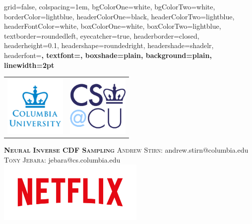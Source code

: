 \documentclass[landscape,paperwidth=40in,paperheight=30in,margin=1in]{baposter}
\begin{document}


\begin{poster}%
  {
  grid=false,
  colspacing=1em,
  bgColorOne=white,
  bgColorTwo=white,
  borderColor=lightblue,
  headerColorOne=black,
  headerColorTwo=lightblue,
  headerFontColor=white,
  boxColorOne=white,
  boxColorTwo=lightblue,
  textborder=roundedleft,
  eyecatcher=true,
  headerborder=closed,
  headerheight=0.1\textheight,
  headershape=roundedright,
  headershade=shadelr,
  headerfont=\large\bf\textsc, %
  textfont={\setlength{\parindent}{1.5em}},
  boxshade=plain,
  background=plain,
  linewidth=2pt
  }
  {
    \begin{tabular}{cc}
         \includegraphics[height=8.0em]{images/columbia_university.png}
         &
         \includegraphics[height=8.0em]{images/cs_cu.png}
    \end{tabular}
    } 
  {\bf\textsc{Neural Inverse CDF Sampling}\vspace{0.5em}}
  {\textsc{Andrew Stirn: }andrew.stirn@columbia.edu\\
   \textsc{Tony Jebara: }jebara@cs.columbia.edu}
  {%
    \includegraphics[height=8.0em]{images/Netflix_Logo_RGB.png}
  }


\end{poster}
\end{document}
